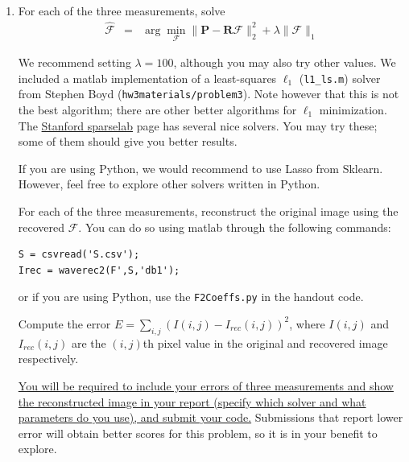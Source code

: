 \begin{enumerate}
\item For each of the three measurements, solve 
\begin{eqnarray}
\hat{\mathcal{F}} & = & \arg\min_{\mathcal{F}} \|\mathbf{P} - \mathbf{R}\mathcal{F}\|_2^2 + \lambda \|\mathcal{F}\|_1
\end{eqnarray}

We recommend setting $\lambda = 100$, although you may also try other values. We included a matlab implementation of a least-squares $\ell_1$ (\texttt{l1\_ls.m}) solver
from Stephen Boyd (\texttt{hw3materials/problem3}). Note however that this is not the best algorithm; there are other better algorithms for $\ell_1$ minimization. The \href{http://sparselab.stanford.edu/}{Stanford sparselab} page has several nice solvers. You may try these; some of them should give you better results. 

If you are using Python, we would recommend to use Lasso from Sklearn. However, feel free to explore other solvers written in Python. 

For each of the three measurements, reconstruct the original image using the recovered $\mathcal{F}$. You can do so using matlab through the following commands:
\begin{lstlisting}
S = csvread('S.csv');
Irec = waverec2(F',S,'db1');
\end{lstlisting}

or if you are using Python, use the \texttt{F2Coeffs.py} in the handout code. 

Compute the error $E = \sum_{i,j} (I(i,j) - I_{rec}(i,j))^2$, where $I(i,j)$ and $I_{rec}(i,j)$ are the $(i,j)$th pixel value in the original and recovered image respectively.

\ul{You will be required to include your errors of three measurements and show the reconstructed image in your report (specify which solver and what parameters do you use), and submit your code.} Submissions that report lower error will obtain better scores for this problem, so it is in your benefit to explore.
\end{enumerate}


